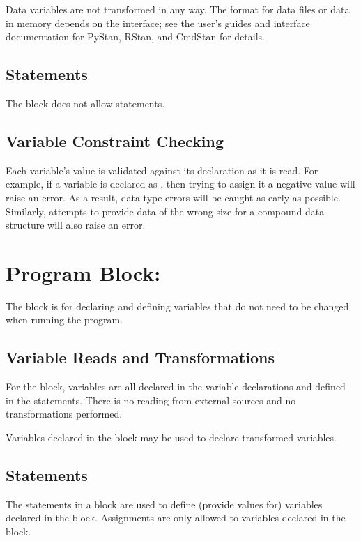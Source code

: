 Data variables are not transformed in any way.  The format for data
files or data in memory depends on the interface; see the user's
guides and interface documentation for PyStan, RStan, and CmdStan for details.

\subsection{Statements}

The  block does not allow statements.

\subsection{Variable Constraint Checking}

Each variable's value is validated against its declaration as it is
read.  For example, if a variable  is declared as
, then trying to assign it a negative value will raise
an error.  As a result, data type errors will be caught as early as
possible.  Similarly, attempts to provide data of the wrong size for a
compound data structure will also raise an error.


\section{Program Block: }

The  block is for declaring and defining
variables that do not need to be changed when running the program.

\subsection{Variable Reads and Transformations}

For the  block, variables are all declared in
the variable declarations and defined in the statements.  There is no
reading from external sources and no transformations performed.

Variables declared in the  block may be used to declare
transformed variables.

\subsection{Statements}

The statements in a  block are used to define
(provide values for) variables declared in the 
block. Assignments are only allowed to variables declared in the
 block.


